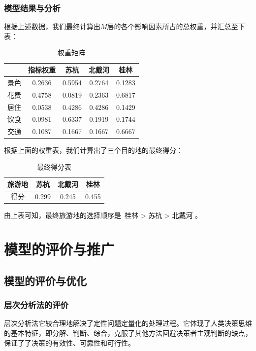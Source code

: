 \documentclass[a4paper]{article}
\begin{document}
    \subsubsection{模型结果与分析}
    根据上述数据，我们最终计算出$ M $层的各个影响因素所占的总权重，并汇总至下表：
    \begin{table}[H]
        \centering
        \caption{权重矩阵}
        \begin{tabular}{@{}ccccc@{}}
            \toprule
            & 指标权重   & 苏杭     & 北戴河    & 桂林     \\ \midrule
            景色 & 0.2636 & 0.5954 & 0.2764 & 0.1283 \\
            花费 & 0.4758 & 0.0819 & 0.2363 & 0.6817 \\
            居住 & 0.0538 & 0.4286 & 0.4286 & 0.1429 \\
            饮食 & 0.0981 & 0.6337 & 0.1919 & 0.1744 \\
            交通 & 0.1087 & 0.1667 & 0.1667 & 0.6667 \\\bottomrule
        \end{tabular}
    \end{table}
    根据上面的权重表，我们计算出了三个目的地的最终得分：
    \begin{table}[H]
        \centering
        \caption{最终得分表}
        \label{tab:my-table}
        \begin{tabular}{@{}cccc@{}}
            \toprule
            旅游地 & 苏杭    & 北戴河   & 桂林    \\ \midrule
            得分  & 0.299 & 0.245 & 0.455 \\ \bottomrule
        \end{tabular}
    \end{table}
    由上表可知，最终旅游地的选择顺序是~桂林 > 苏杭 > 北戴河 。
    \section{模型的评价与推广}
    \subsection{模型的评价与优化}
    \subsubsection{层次分析法的评价}
    层次分析法它较合理地解决了定性问题定量化的处理过程。它体现了人类决策思维的基本特征，即分解、判断、综合，克服了其他方法回避决策者主观判断的缺点，保证了了决策的有效性、可靠性和可行性\cite{司守奎}。
\end{document}
